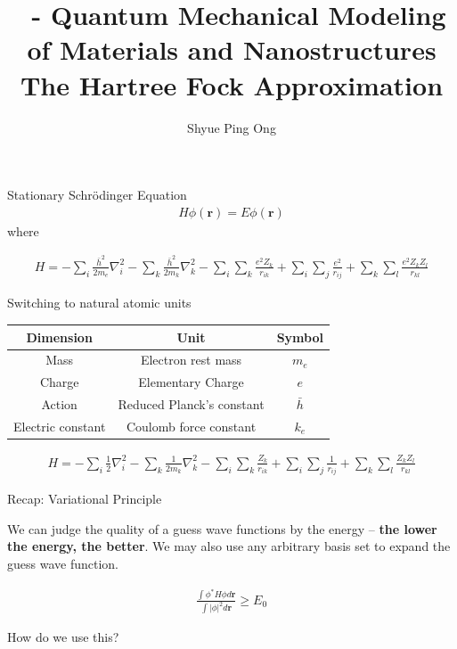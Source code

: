 \documentclass[aspectratio=169]{beamer}
\title[\classname The Hartree Fock Approximation]{\classname~- Quantum Mechanical Modeling of Materials and Nanostructures\\The Hartree Fock Approximation}
\author{Shyue Ping Ong}
\institute[UCSD]{University of California, San Diego\\
\medskip
}
\date{\classyear} %
\let \vec \mathbf
\begin{document}
    \begin{frame}
        \titlepage %
    \end{frame}

    \begin{frame}{Stationary Schr\"odinger Equation}
        \begin{eqnarray*}
            H\phi(\vec{r}) = E\phi(\vec{r})
        \end{eqnarray*}
        where

        \begin{eqnarray*}
            H = -\sum_i \frac{\bar{h}^2}{2m_e}\nabla_i^2
            -\sum_k \frac{\bar{h}^2}{2m_k}\nabla_k^2
            -\sum_i\sum_k \frac{e^2Z_k}{r_{ik}}
            +\sum_i\sum_j \frac{e^2}{r_{ij}}
            +\sum_k\sum_l \frac{e^2Z_kZ_l}{r_{kl}}
        \end{eqnarray*}
    \end{frame}

    \begin{frame}{Switching to natural atomic units}
        \begin{table}[]
            \centering
            \begin{tabular}{ccc}
                \textbf{Dimension} & \textbf{Unit}             & \textbf{Symbol } \\
                \hline
                Mass               & Electron rest mass        & $m_e$            \\
                Charge             & Elementary Charge         & $e$              \\
                Action             & Reduced Planck's constant & $\bar{h}$        \\
                Electric constant  & Coulomb force constant    & $k_e$
            \end{tabular}
        \end{table}

        \begin{eqnarray*}
            H = -\sum_i \frac{1}{2}\nabla_i^2
            -\sum_k \frac{1}{2m_k}\nabla_k^2
            -\sum_i\sum_k \frac{Z_k}{r_{ik}}
            +\sum_i\sum_j \frac{1}{r_{ij}}
            +\sum_k\sum_l \frac{Z_kZ_l}{r_{kl}}
        \end{eqnarray*}

    \end{frame}

    \begin{frame}{Recap: Variational Principle}

        We can judge the quality of a guess wave functions by the energy – \textbf{the lower the energy, the better}. We may also use any arbitrary basis set to expand the guess wave function.

        \begin{eqnarray*}
            \frac{\int \phi^* H \phi d\vec{r}}{\int |\phi|^2 d\vec{r}} \geq E_0
        \end{eqnarray*}

        How do we use this?
    \end{frame}
\end{document}

